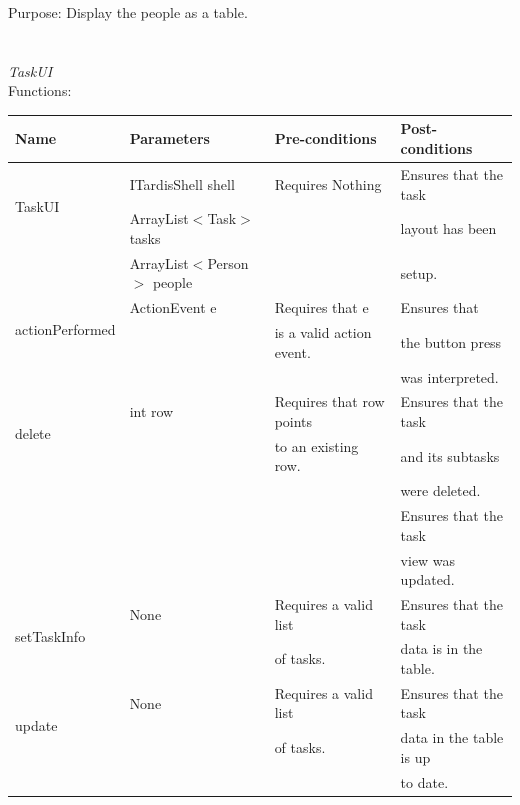 Purpose: Display the people as a table.\\
\\
\\
\emph{TaskUI}\\
Functions:\\
\begin{tabular}{| l | l | l | l |}
\hline
Name & Parameters & Pre-conditions & Post-conditions\\
\hline
\multirow{2}{*}{TaskUI}{} & ITardisShell shell & Requires Nothing & Ensures that the task\\ 
			        & ArrayList$<$Task$>$ tasks & & layout has been\\ 
                                            & ArrayList$<$Person$>$ people & & setup.
\\
\hline
\multirow{2}{*}{actionPerformed} & ActionEvent e & Requires that e            & Ensures that\\
                                                        &                        & is a valid action event. & the button press\\
                                                        &                        &                                      & was interpreted.
\\
\hline
\multirow{2}{*}{delete} & int row         & Requires that row points & Ensures that the task \\
		 	    &                     & to an existing row.          & and its subtasks\\
		 	    &                     &                                         & were deleted.\\
 			    &                     &                                         & Ensures that the task\\
                                        &                     &                                         & view was updated.
\\
\hline
\multirow{2}{*}{setTaskInfo} & None & Requires a valid list & Ensures that the task \\
		 		&          & of tasks.                   & data is in the table. 
\\
\hline
\multirow{2}{*}{update} & None & Requires a valid list & Ensures that the task\\
		 	     &          & of tasks.                  & data in the table is up\\
			     &          &                                 & to date.
\\

\end{tabular}
